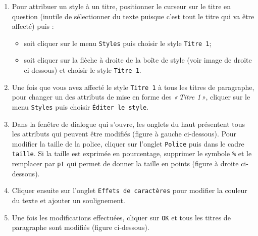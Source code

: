 \begin{enumerate}
\item Pour attribuer un style à un titre, positionner le curseur sur le titre en question (inutile de sélectionner du texte puisque c'est tout le titre qui va être affecté) puis : 

\begin{itemize}
\item soit cliquer sur le menu \texttt{Styles} puis choisir le style \texttt{Titre 1};
\item soit cliquer sur la flèche à droite de la boîte de style (voir image de droite ci-dessous) et choisir le style \texttt{Titre 1}.
\end{itemize}


\item Une fois que vous avez affecté le style \texttt{Titre 1} à tous les titres de paragraphe, pour changer un des attributs de mise en forme des \emph{«\,Titre 1\,»}, cliquer sur le menu \texttt{Styles} puis choisir \texttt{Éditer le style}.


\item Dans la fenêtre de dialogue qui s'ouvre, les onglets du haut présentent tous les attributs qui peuvent être modifiés (figure à gauche ci-dessous). Pour modifier la taille de la police, cliquer sur l'onglet \texttt{Police} puis dans le cadre \texttt{taille}. Si la taille est exprimée en pourcentage, supprimer le symbole \texttt{\%} et le remplacer par \texttt{pt} qui permet de donner la taille en points (figure à droite ci-dessous).


\item Cliquer ensuite sur l'onglet \texttt{Effets de caractères} pour modifier la couleur du texte et ajouter un soulignement.


\item Une fois les modifications effectuées, cliquer sur \texttt{OK} et tous les titres de paragraphe sont modifiés (figure ci-dessous).


\end{enumerate}


